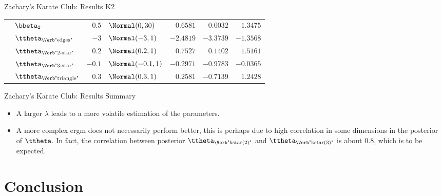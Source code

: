 \documentclass{beamer}
\begin{document}
\begin{frame}{Zachary's Karate Club: Results K2}
\begin{center}
\begin{tabular}{cl|rlrrr}
			& $\bbeta_{2}$                       & $0.5$  & $\Normal(0,30)$      & $0.6581$  & $0.0032$  & $1.3475$   \\
			& $\ttheta_{\text{\Verb"edges"}}$    & $-3$   & $\Normal(-3,1)$      & $-2.4819$ & $-3.3739$ & $-1.3568$  \\
			& $\ttheta_{\text{\Verb"2-star"}}$   & $0.2$  & $\Normal(0.2,1)$     & $0.7527$  & $0.1402$  & $1.5161$   \\
			& $\ttheta_{\text{\Verb"3-star"}}$   & $-0.1$ & $\Normal(-0.1,1)$    & $-0.2971$ & $-0.9783$ & $-0.0365$  \\
			& $\ttheta_{\text{\Verb"triangle"}}$ & $0.3$  & $\Normal(0.3,1)$     & $0.2581$  & $-0.7139$ & $1.2428$   \\
			\bottomrule
		\end{tabular}
	\end{center}
\end{frame}

\begin{frame}{Zachary's Karate Club: Results Summary}
	\begin{itemize}
		\item
			A larger $\lambda$ leads to a more volatile estimation of the parameters.
		\item
			A more complex \acrshort{ergm} does not necessarily perform better,
			this is perhaps due to high correlation in some dimensions in the posterior of $\ttheta$.
			In fact, the correlation between posterior $\ttheta_{\text{\Verb"kstar(2)"}}$ and $\ttheta_{\text{\Verb"kstar(3)"}}$ is about $0.8$,
			which is to be expected.
	\end{itemize}
\end{frame}

\section{Conclusion}
\end{document}
